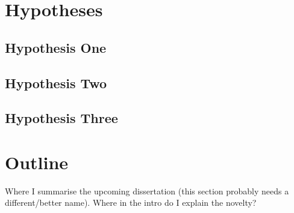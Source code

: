 \section{Hypotheses}

\subsection{Hypothesis One}

\subsection{Hypothesis Two}

\subsection{Hypothesis Three}

\section{Outline}
Where I summarise the upcoming dissertation (this section probably needs a different/better name).  Where in the intro do I explain the novelty?